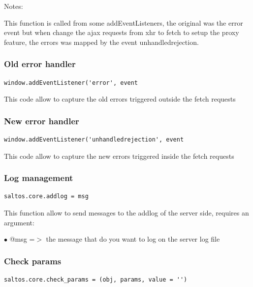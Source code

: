 \documentclass[a4paper]{article}
\begin{document}
Notes:

This function is called from some addEventListeners, the original was the error event
but when change the ajax requests from xhr to fetch to setup the proxy feature, the
errors was mapped by the event unhandledrejection.

\hypertarget{toc135}{}
\subsubsection{Old error handler}

\begin{lstlisting}
window.addEventListener('error', event
\end{lstlisting}

This code allow to capture the old errors triggered outside the fetch requests

\hypertarget{toc136}{}
\subsubsection{New error handler}

\begin{lstlisting}
window.addEventListener('unhandledrejection', event
\end{lstlisting}

This code allow to capture the new errors triggered inside the fetch requests

\hypertarget{toc137}{}
\subsubsection{Log management}

\begin{lstlisting}
saltos.core.addlog = msg
\end{lstlisting}

This function allow to send messages to the addlog of the server side, requires an argument:

\begin{compactitem}
\item[\color{myblue}$\bullet$] @msg =$>$ the message that do you want to log on the server log file
\end{compactitem}

\hypertarget{toc138}{}
\subsubsection{Check params}

\begin{lstlisting}
saltos.core.check_params = (obj, params, value = '')
\end{lstlisting}
\end{document}
